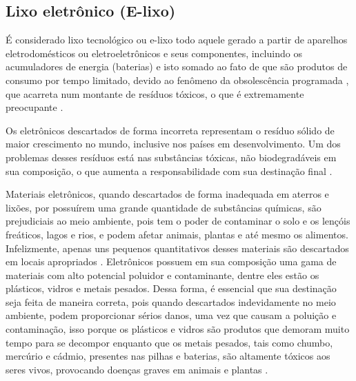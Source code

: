 \documentclass[
	12pt,				%
	openany,			%
	twoside,			%
	a4paper,			%
	english,			%
	french,				%
	spanish,			%
	brazil				%
	]{abntex2}
\begin{document}
\subsection{Lixo eletrônico (E-lixo)}
É considerado lixo tecnológico ou e-lixo todo aquele gerado a partir de aparelhos eletrodomésticos ou eletroeletrônicos e seus componentes, incluindo os acumuladores de energia (baterias) e isto somado ao fato de que são produtos de consumo por tempo limitado, devido ao fenômeno da obsolescência programada , que acarreta num montante de resíduos tóxicos, o que é extremamente preocupante \cite{edbasica}.


Os eletrônicos descartados de forma incorreta representam o resíduo sólido de maior crescimento no mundo, inclusive nos países em desenvolvimento. Um dos problemas desses resíduos está nas substâncias tóxicas, não biodegradáveis em sua composição, o que aumenta a responsabilidade com sua destinação final \cite{vbd}.

Materiais eletrônicos, quando descartados de forma inadequada em aterros e lixões, por possuírem uma grande quantidade de substâncias químicas, são prejudiciais ao meio ambiente, pois tem o poder de contaminar o solo e os lençóis freáticos, lagos e rios, e podem afetar animais, plantas e até mesmo os alimentos. Infelizmente, apenas uns pequenos quantitativos desses materiais são descartados em locais apropriados \cite{cn}. 
Eletrônicos possuem em sua composição uma gama de materiais com alto potencial poluidor e contaminante, dentre eles estão os plásticos, vidros e metais pesados. Dessa forma, é essencial que sua destinação seja feita de maneira correta, pois quando descartados indevidamente no meio ambiente, podem proporcionar sérios danos, uma vez que causam a poluição e contaminação, isso porque os plásticos e vidros são produtos que demoram muito tempo para se decompor enquanto que os metais pesados, tais como chumbo, mercúrio e cádmio, presentes nas pilhas e baterias, são altamente tóxicos aos seres vivos, provocando doenças graves em animais e plantas \cite{aftc}.
\end{document}
